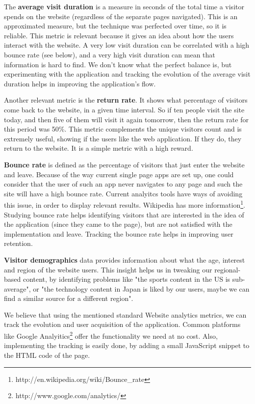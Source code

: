 \documentclass{acm_proc_10ptArticle-sp}
\begin{document}
The \textbf{average visit duration} is a measure in seconds of the total time a visitor spends on the website (regardless of the separate pages navigated). This is an approximated measure, but the technique was perfected over time, so it is reliable. This metric is relevant because it gives an idea about how the users interact with the website. A very low visit duration can be correlated with a high bounce rate (see below), and a very high visit duration can mean that information is hard to find. We don't know what the perfect balance is, but experimenting with the application and tracking the evolution of the average visit duration helps in improving the application's flow.

Another relevant metric is the \textbf{return rate}. It shows what percentage of visitors come back to the website, in a given time interval. So if ten people visit the site today, and then five of them will visit it again tomorrow, then the return rate for this period was 50\%. This metric complements the unique visitors count and is extremely useful, showing if the users like the web application. If they do, they return to the website. It is a simple metric with a high reward.

\textbf{Bounce rate} is defined as the percentage of visitors that just enter the website and leave. Because of the way current single page apps are set up, one could consider that the user of such an app never navigates to any page and such the site will have a high bounce rate. Current analyitcs tools have ways of avoiding this issue, in order to display relevant results. Wikipedia has more information\footnote{http://en.wikipedia.org/wiki/Bounce\_rate}. Studying bounce rate helps identifying visitors that are interested in the idea of the application (since they came to the page), but are not satisfied with the implementation and leave. Tracking the bounce rate helps in improving user retention.

\textbf{Visitor demographics} data provides information about what the age, interest and region of the website users. This insight helps us in tweaking our regional-based content, by identifying problems like "the sports content in the US is sub-average", or "the technology content in Japan is liked by our users, maybe we can find a similar source for a different region".

We believe that using the mentioned standard Website analytics metrics, we can track the evolution and user acquisition of the application. Common platforms like Google Analyitics\footnote{http://www.google.com/analytics/} offer the functionality we need at no cost. Also, implementing the tracking is easily done, by adding a small JavaScript snippet to the HTML code of the page.
\end{document}

